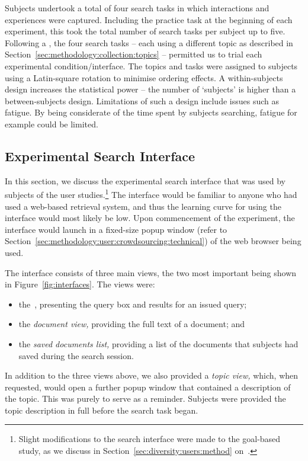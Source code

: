Subjects undertook a total of four search tasks in which interactions and experiences were captured. Including the practice task at the beginning of each experiment, this took the total number of search tasks per subject up to five. Following a , the four search tasks -- each using a different topic as described in Section~\ref{sec:methodology:collection:topics} -- permitted us to trial each experimental condition/interface. The topics and tasks were assigned to subjects using a Latin-square rotation to minimise ordering effects. A within-subjects design increases the statistical power -- the number of `subjects' is higher than a between-subjects design. Limitations of such a design include issues such as fatigue. By being considerate of the time spent by subjects searching, fatigue for example could be limited.

\subsection{Experimental Search Interface}\label{sec:methodology:user:interface}
In this section, we discuss the experimental search interface that was used by subjects of the user studies.\footnote{Slight modifications to the search interface were made to the goal-based study, as we discuss in Section~\ref{sec:diversity:users:method} on~\pageref{sec:diversity:users:method}.} The interface would be familiar to anyone who had used a web-based retrieval system, and thus the learning curve for using the interface would most likely be low. Upon commencement of the experiment, the interface would launch in a fixed-size popup window (refer to Section~\ref{sec:methodology:user:crowdsourcing:technical}) of the web browser being used.

The interface consists of three main views, the two most important being shown in Figure~\ref{fig:interfaces}. The views were:

\begin{itemize}
    \item{the~, presenting the query box and results for an issued query;}
    \item{the \emph{document view,} providing the full text of a document; and}
    \item{the \emph{saved documents list,} providing a list of the documents that subjects had saved during the search session.}
\end{itemize}

In addition to the three views above, we also provided a \emph{topic view,} which, when requested, would open a further popup window that contained a description of the topic. This was purely to serve as a reminder. Subjects were provided the topic description in full before the search task began.

